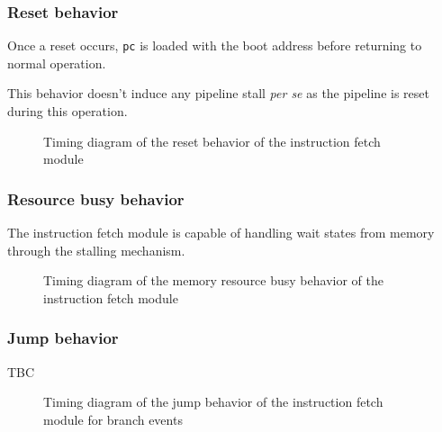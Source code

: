     \subsubsection{Reset behavior}

      \begin{content}
          Once a reset occurs, \texttt{pc} is loaded with the boot address before returning to normal operation.

          This behavior doesn't induce any pipeline stall \textit{per se} as the pipeline is reset during this operation.
        \end{content}

      \begin{figure}[H]
          \centering
          
          \caption{Timing diagram of the reset behavior of the instruction fetch module}
          \label{fig:ifm-behavior-reset}
        \end{figure}

    \subsubsection{Resource busy behavior}

      \begin{content}
          The instruction fetch module is capable of handling wait states from memory through the stalling mechanism.
        \end{content}

      \begin{figure}[H]
          \centering
          
          \caption{Timing diagram of the memory resource busy behavior of the instruction fetch module}
          \label{fig:ifm-behavior-wait}
        \end{figure}

    \subsubsection{Jump behavior}

      \begin{content}
          TBC
        \end{content}

      \begin{figure}[H]
          \centering
          
          \caption{Timing diagram of the jump behavior of the instruction fetch module for branch events}
          \label{fig:ifm-behavior-branch}
        \end{figure}

